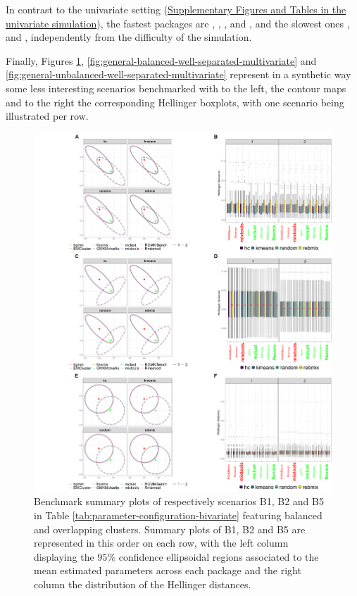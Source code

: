 In contrast to the univariate setting (\protect\hyperlink{supplementary-figures-and-tables-in-the-univariate-simulation}{Supplementary Figures and Tables in the univariate simulation}), the fastest packages are , , , and , and the slowest ones ,  and , independently from the difficulty of the simulation.

\newpage

Finally, Figures \ref{fig:general-balanced-overlapping-multivariate}, \ref{fig:general-balanced-well-separated-multivariate} and \ref{fig:general-unbalanced-well-separated-multivariate} represent in a synthetic way some less interesting scenarios benchmarked with to the left, the contour maps and to the right the corresponding Hellinger boxplots, with one scenario being illustrated per row.

\begin{figure}

{\centering \includegraphics[width=1\linewidth]{figs/multivariate/multivariate_balanced_overlapping} 

}

\caption{Benchmark summary plots of respectively scenarios B1, B2 and B5 in Table \ref{tab:parameter-configuration-bivariate} featuring balanced and overlapping clusters. Summary plots of B1, B2 and B5 are represented in this order on each row, with the left column displaying the $95\%$ confidence ellipsoidal regions associated to the mean estimated parameters across each package and the right column the distribution of the Hellinger distances.}\label{fig:general-balanced-overlapping-multivariate}
\end{figure}

